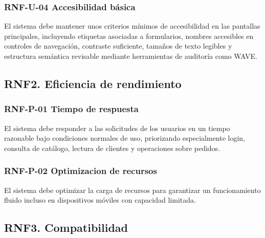 \vspace{-0.75em}
\subsubsection{RNF-U-04 Accesibilidad básica}
\vspace{-1em}

El sistema debe mantener unos criterios mínimos de accesibilidad en las pantallas principales, incluyendo etiquetas asociadas a formularios, nombres accesibles en controles de navegación, contraste suficiente, tamaños de texto legibles y estructura semántica revisable mediante herramientas de auditoría como WAVE.

\subsection{RNF2. Eficiencia de rendimiento}

\vspace{-0.75em}
\subsubsection{RNF-P-01 Tiempo de respuesta}
\vspace{-1em}

El sistema debe responder a las solicitudes de los usuarios en un tiempo razonable bajo condiciones normales de uso, priorizando especialmente login, consulta de catálogo, lectura de clientes y operaciones sobre pedidos.

\vspace{-0.75em}
\subsubsection{RNF-P-02 Optimizacion de recursos}
\vspace{-1em}

El sistema debe optimizar la carga de recursos para garantizar un funcionamiento fluido incluso en dispositivos móviles con capacidad limitada.

\subsection{RNF3. Compatibilidad}

